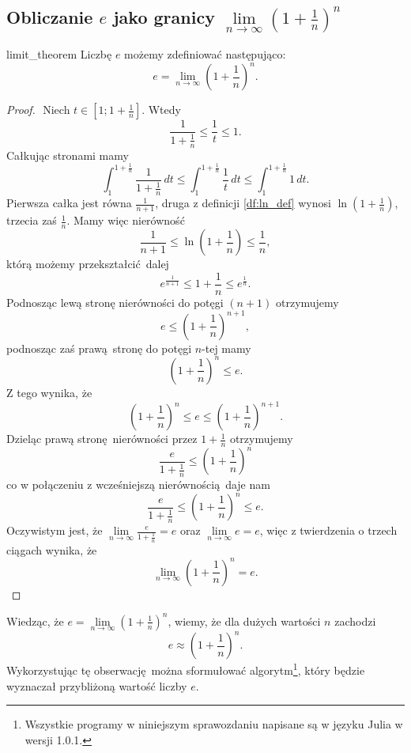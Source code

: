 \documentclass[12pt]{article}
\begin{document}
\subsection{Obliczanie $e$ jako granicy $\lim\limits_{n \to \infty}{(1 + \frac{1}{n})^n}$}

\begin{theo}{}{limit_theorem}
    Liczbę $e$ możemy zdefiniować następująco:
    \large$$e = \lim\limits_{n \to \infty}(1 + \frac{1}{n})^n.$$\normalsize
    \begin{proof}
        $ $
        Niech $t \in [1; 1 + \frac{1}{n}]$.
        Wtedy $$\frac{1}{1 + \frac{1}{n}} \leq \frac{1}{t} \leq 1.$$
        Całkując stronami mamy 
        $$\int_{1}^{1+\frac{1}{n}} {\frac{1}{1+\frac{1}{n}}}\,dt \leq
        \int_{1}^{1+\frac{1}{n}} {\frac{1}{t}}\,dt \leq
        \int_{1}^{1+\frac{1}{n}} {1}\,dt.$$
        Pierwsza całka jest równa $\frac{1}{n+1}$, druga z definicji \ref{df:ln_def} wynosi
        $\ln(1+\frac{1}{n})$, trzecia zaś $\frac{1}{n}$.
        Mamy więc nierówność
        $$\frac{1}{n+1} \leq \ln{(1 + \frac{1}{n})} \leq \frac{1}{n},$$
        którą możemy przekształcić dalej
        $$e^{\frac{1}{n + 1}} \leq 1 + \frac{1}{n} \leq e^{\frac{1}{n}}.$$
        Podnosząc lewą stronę nierówności do potęgi $(n + 1)$ otrzymujemy
        $$e \leq (1 + \frac{1}{n})^{n+1},$$
        podnosząc zaś prawą stronę do potęgi $n$-tej mamy
        $$(1 + \frac{1}{n})^n \leq e.$$
        Z tego wynika, że
        $$(1 + \frac{1}{n})^n \leq e \leq (1 + \frac{1}{n})^{n+1}.$$
        Dzieląc prawą stronę nierówności przez $1 + \frac{1}{n}$ otrzymujemy
        $$\frac{e}{1 + \frac{1}{n}} \leq (1 + \frac{1}{n})^n$$
        co w połączeniu z wcześniejszą nierównością daje nam
        $$\frac{e}{1+\frac{1}{n}} \leq (1 + \frac{1}{n})^n \leq e.$$
        Oczywistym jest, że 
        $\lim\limits_{n \to \infty}{\frac{e}{1 + \frac{1}{n}}} = e$ oraz
        $\lim\limits_{n \to \infty}{e} = e$, więc z twierdzenia o trzech ciągach
        wynika, że
        $$\lim\limits_{n \to \infty}{(1 + \frac{1}{n})^n} = e.$$
    \end{proof}
\end{theo}

Wiedząc, że $e = \lim\limits_{n \to \infty}{(1 + \frac{1}{n})^n}$, wiemy, że 
dla dużych wartości $n$ zachodzi
$$ e \approx (1 + \frac{1}{n})^n. $$
Wykorzystując tę obserwację można sformułować algorytm\footnote{Wszystkie programy w niniejszym sprawozdaniu napisane są w języku Julia w wersji 1.0.1.}, 
który będzie wyznaczał przybliżoną wartość liczby $e$.
\end{document}
